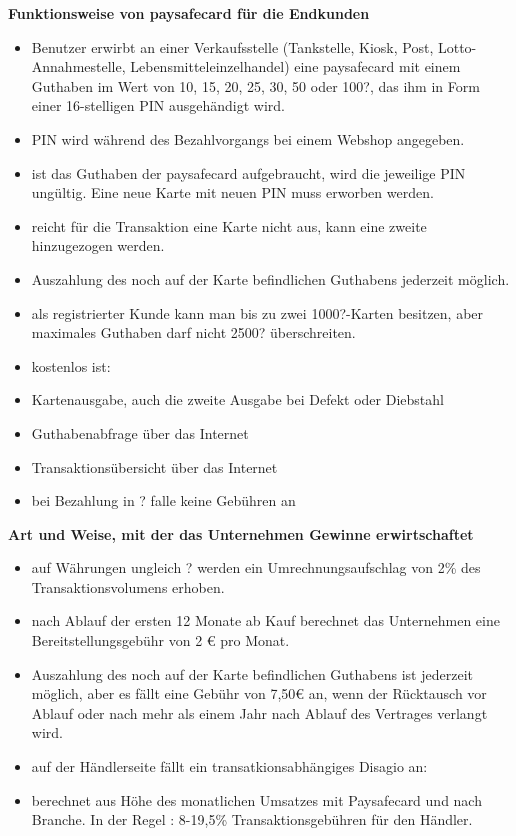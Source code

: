 \textbf{Funktionsweise von paysafecard für die Endkunden}

\begin{itemize}
        \item Benutzer erwirbt an einer Verkaufsstelle (Tankstelle, Kiosk, Post, Lotto-Annahmestelle, Lebensmitteleinzelhandel) eine paysafecard mit einem Guthaben im Wert von 10, 15, 20, 25, 30, 50 oder 100?, das ihm in Form einer 16-stelligen PIN ausgehändigt wird.
        \item PIN wird während des Bezahlvorgangs bei einem Webshop angegeben.
        \item ist das Guthaben der paysafecard aufgebraucht, wird die jeweilige PIN ungültig. Eine neue Karte mit neuen PIN muss erworben werden.
        \item reicht für die Transaktion eine Karte nicht aus, kann eine zweite hinzugezogen werden.
        \item Auszahlung des noch auf der Karte befindlichen Guthabens jederzeit möglich.
        \item als registrierter Kunde kann man bis zu zwei 1000?-Karten besitzen, aber maximales Guthaben darf nicht 2500? überschreiten.
        \item kostenlos ist:
        \item   Kartenausgabe, auch die zweite Ausgabe bei Defekt oder Diebstahl
        \item   Guthabenabfrage über das Internet
        \item   Transaktionsübersicht über das Internet
        \item   bei Bezahlung in ? falle keine Gebühren an
\end{itemize}


\textbf{Art und Weise, mit der das Unternehmen Gewinne erwirtschaftet}

\begin{itemize}
        \item auf Währungen ungleich ? werden ein Umrechnungsaufschlag von 2\% des Transaktionsvolumens erhoben.
        \item nach Ablauf der ersten 12 Monate ab Kauf berechnet das Unternehmen eine Bereitstellungsgebühr von 2 \euro{} pro Monat.
        \item Auszahlung des noch auf der Karte befindlichen Guthabens ist jederzeit möglich, aber es fällt eine Gebühr von 7,50\euro{} an, wenn der Rücktausch vor Ablauf oder nach mehr als einem Jahr nach Ablauf des Vertrages verlangt wird.
        \item auf der Händlerseite fällt ein transatkionsabhängiges Disagio an:
        \item   berechnet aus Höhe des monatlichen Umsatzes mit Paysafecard und nach Branche. In der Regel : 8-19,5\% Transaktionsgebühren für den Händler.
\end{itemize}


